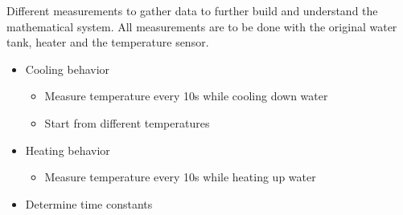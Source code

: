 Different measurements to gather data to further build and understand the mathematical system. All measurements are to be done with the original water tank, heater and the temperature sensor.
\begin{itemize}
\item Cooling behavior 
	\begin{itemize}
	\item Measure temperature every 10s while cooling down water 
	\item Start from different temperatures
	\end{itemize}
\item Heating behavior
	\begin{itemize}
	\item Measure temperature every 10s while heating up water
	\end{itemize}
\item Determine time constants
\end{itemize}





